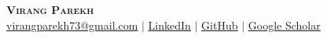 \documentclass[../../resume]{subfiles}
\begin{document}
\begin{center}
    \textbf{\Huge \scshape Virang Parekh} \\ \vspace{1pt}
    \href{mailto:virangparekh73@gmail.com}{\underline{virangparekh73@gmail.com}} $|$ 
    \href{https://www.linkedin.com/in/virang-parekh/}{\underline{LinkedIn}} $|$
    \href{https://github.com/VirangParekh}{\underline{GitHub}} $|$
    \href{https://scholar.google.com/citations?user=7OuFvOQAAAAJ&hl=en&authuser=1}{\underline{Google Scholar}}
\end{center}
\end{document}
